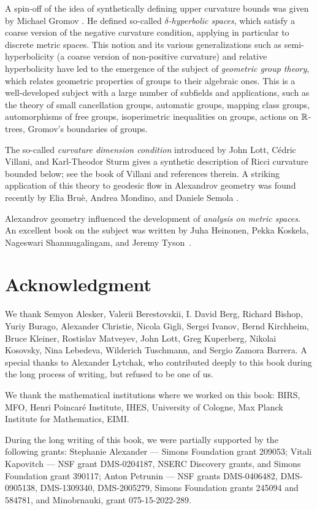 A spin-off of the idea of synthetically defining upper curvature bounds 
was given by Michael Gromov \cite{gromov:hyp-groups}. 
He  defined so-called  {}\emph{$\delta$-hyperbolic spaces}, which satisfy   a coarse version of the  negative curvature condition, applying  in particular to discrete metric spaces.
This notion and its various generalizations such as semi-hyperbolicity (a coarse version of non-positive curvature) and relative hyperbolicity have  led to the emergence of the subject of {}\emph{geometric group theory}, which relates geometric properties of groups to their algebraic ones.
This is a well-developed subject with a large number of subfields and applications, such as the theory of small cancellation groups, automatic groups,  mapping class groups, automorphisms of free groups, isoperimetric inequalities on groups, actions on $\mathbb{R}$-trees, Gromov's boundaries of groups.

{\sloppy

The so-called {}\emph{curvature dimension condition} introduced by John Lott, C\'edric Villani, and Karl-Theodor Sturm gives a synthetic description of Ricci curvature bounded below; see the book of Villani \cite{villani} and references therein.
A striking application of this theory to geodesic flow in Alexandrov geometry was found recently by
Elia Bruè,
Andrea Mondino,
and Daniele Semola \cite{brue-mondino-semola}.

Alexandrov geometry influenced the development of {}\emph{analysis on metric spaces}. 
An excellent book on the subject was written by Juha Heinonen, Pekka Koskela, Nageswari Shanmugalingam, and Jeremy Tyson~\cite{heinonen-koskela-shanmugalingam-tyson}.

}

\section*{Acknowledgment}
We thank 
Semyon Alesker,
Valerii Berestovskii,
I. David Berg,
Richard Bishop, 
Yuriy Burago, 
Alexander Christie,
Nicola Gigli,
Sergei Ivanov,
Bernd Kirchheim, 
Bruce Kleiner, 
Rostislav Matveyev,
John Lott, 
Greg Kuperberg, 
Nikolai Kosovsky, 
Nina Lebedeva,
Wilderich Tuschmann, 
and
Sergio Zamora Barrera.
A special thanks to Alexander Lytchak, who contributed deeply to this book during the long process of writing, but refused to be one of us.

We thank the mathematical institutions where we worked on this book: 
BIRS, 
MFO,
Henri Poincar\'{e} Institute,
IHES,
University of Cologne, 
Max Planck Institute for Mathematics,
EIMI.


During the long writing of this book, we were partially supported by the following grants:
Stephanie Alexander --- 
Simons Foundation grant 209053;
Vitali Kapovitch ---  NSF grant DMS-0204187, NSERC Discovery grants, and Simons Foundation grant 390117;
Anton Petrunin --- 
NSF grants
DMS-0406482,
DMS-0905138,
DMS-1309340,
DMS-2005279,
Simons Foundation grants 
245094 and 584781,
and
Minobrnauki, grant 075-15-2022-289.
